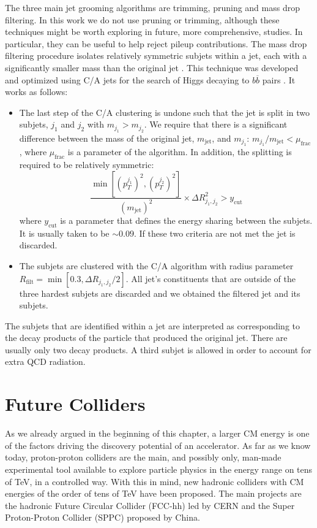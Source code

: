 The three main jet grooming algorithms are trimming, pruning and mass drop filtering. In this work we do not use pruning or trimming, although these techniques might be worth exploring in future, more comprehensive, studies. In particular, they can be useful to help reject pileup contributions. The mass drop filtering procedure isolates relatively symmetric subjets within a jet, each with a significantly smaller mass than the original jet \cite{jetsub}. This technique was developed and optimized using C/A jets for the search of Higgs decaying to $b\overline{b}$ pairs \cite{BDRS}. It works as follows:
\begin{itemize}
	\item The last step of the C/A clustering is undone such that the jet is split in two subjets, $j_1$ and $j_2$ with $m_{j_1}>m_{j_2}$. We require that there is a significant difference between the mass of the original jet, $m_{\text{jet}}$, and $m_{j_1}$: $m_{j_1}/m_{\text{jet}} < \mu_{\text{frac}}$, where $\mu_{\text{frac}}$ is a parameter of the algorithm. In addition, the splitting is required to be relatively symmetric:
	\begin{equation}
		\frac{\min[(p_T^{j_1})^2,(p_T^{j_2})^2]}{(m_{\text{jet}})^2} \times \Delta R_{j_1,j_2}^2 > y_{\text{cut}}
	\end{equation}
	where $y_{\text{cut}}$ is a parameter that defines the energy sharing between the subjets. It is usually taken to be $\sim 0.09$. If these two criteria are not met the jet is discarded.
	
	\item The subjets are clustered with the C/A algorithm with radius parameter $R_{\text{filt}}=\min[0.3,\Delta R_{j_1,j_2}/2]$. All jet's constituents that are outside of the three hardest subjets are discarded and we obtained the filtered jet and its subjets.
\end{itemize}

The subjets that are identified within a jet are interpreted as corresponding to the decay products of the particle that produced the original jet. There are usually only two decay products. A third subjet is allowed in order to account for extra QCD radiation.

\section{Future Colliders}
\label{section:future_colliders}

As we already argued in the beginning of this chapter, a larger CM energy is one of the factors driving the discovery potential of an accelerator. As far as we know today, proton-proton colliders are the main, and possibly only, man-made experimental tool available to explore particle physics in the energy range on tens of TeV, in a controlled way. With this in mind, new hadronic colliders with CM energies of the order of tens of TeV have been proposed. The main projects are the hadronic Future Circular Collider (FCC-hh) led by CERN and the Super Proton-Proton Collider (SPPC) proposed by China. 

